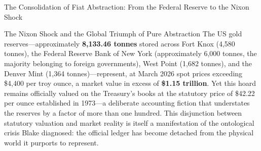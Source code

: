\documentclass[
  ignorenonframetext,
]{beamer}
\begin{document}
\begin{frame}{The Consolidation of Fiat Abstraction: From the Federal
Reserve to the Nixon Shock}
\begin{block}{The Nixon Shock and the Global Triumph of Pure
Abstraction}
The US gold reserves---approximately \textbf{8,133.46 tonnes} stored
across Fort Knox (4,580 tonnes), the Federal Reserve Bank of New York
(approximately 6,000 tonnes, the majority belonging to foreign
governments), West Point (1,682 tonnes), and the Denver Mint (1,364
tonnes)---represent, at March 2026 spot prices exceeding \$4,400 per
troy ounce, a market value in excess of \textbf{\$1.15 trillion}. Yet
this hoard remains officially valued on the Treasury's books at the
statutory price of \$42.22 per ounce established in 1973---a deliberate
accounting fiction that understates the reserves by a factor of more
than one hundred. This disjunction between statutory valuation and
market reality is itself a manifestation of the ontological crisis Blake
diagnosed: the official ledger has become detached from the physical
world it purports to represent.
\end{block}
\end{frame}
\end{document}
